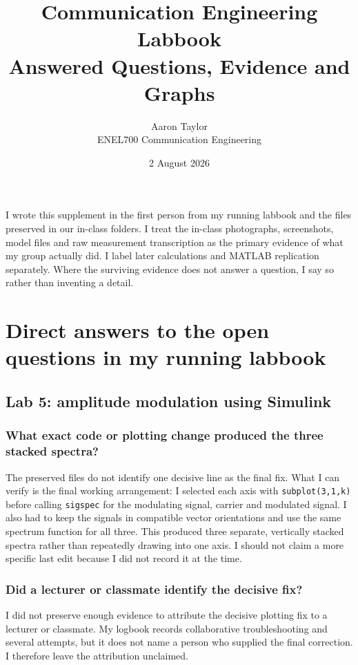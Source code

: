 \documentclass[11pt,a4paper]{article}
\title{\vspace{-1.5cm}\textbf{Communication Engineering Labbook}\\[0.3em]
\Large Answered Questions, Evidence and Graphs}
\author{Aaron Taylor\\ENEL700 Communication Engineering}
\date{2 August 2026}
\begin{document}
\maketitle

\begin{evidencebox}
I wrote this supplement in the first person from my running labbook and the files preserved in our in-class folders. I treat the in-class photographs, screenshots, model files and raw measurement transcription as the primary evidence of what my group actually did. I label later calculations and MATLAB replication separately. Where the surviving evidence does not answer a question, I say so rather than inventing a detail.
\end{evidencebox}

\tableofcontents
\newpage

\section{Direct answers to the open questions in my running labbook}

\subsection{Lab 5: amplitude modulation using Simulink}

\subsubsection*{What exact code or plotting change produced the three stacked spectra?}
\begin{answerbox}
The preserved files do not identify one decisive line as the final fix. What I can verify is the final working arrangement: I selected each axis with \texttt{subplot(3,1,k)} before calling \texttt{sigspec} for the modulating signal, carrier and modulated signal. I also had to keep the signals in compatible vector orientations and use the same spectrum function for all three. This produced three separate, vertically stacked spectra rather than repeatedly drawing into one axis. I should not claim a more specific last edit because I did not record it at the time.
\end{answerbox}

\subsubsection*{Did a lecturer or classmate identify the decisive fix?}
\begin{answerbox}
I did not preserve enough evidence to attribute the decisive plotting fix to a lecturer or classmate. My logbook records collaborative troubleshooting and several attempts, but it does not name a person who supplied the final correction. I therefore leave the attribution unclaimed.
\end{answerbox}
\end{document}
